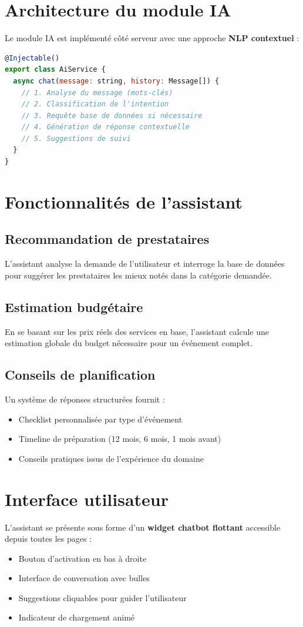 \documentclass[12pt,a4paper]{report}
\begin{document}
\section{Architecture du module IA}
Le module IA est implémenté côté serveur avec une approche \textbf{NLP contextuel} :

\begin{lstlisting}[language=JavaScript, caption=Architecture du service AI]
@Injectable()
export class AiService {
  async chat(message: string, history: Message[]) {
    // 1. Analyse du message (mots-clés)
    // 2. Classification de l'intention
    // 3. Requête base de données si nécessaire
    // 4. Génération de réponse contextuelle
    // 5. Suggestions de suivi
  }
}
\end{lstlisting}

\section{Fonctionnalités de l'assistant}

\subsection{Recommandation de prestataires}
L'assistant analyse la demande de l'utilisateur et interroge la base de données pour suggérer les prestataires les mieux notés dans la catégorie demandée.

\subsection{Estimation budgétaire}
En se basant sur les prix réels des services en base, l'assistant calcule une estimation globale du budget nécessaire pour un événement complet.

\subsection{Conseils de planification}
Un système de réponses structurées fournit :
\begin{itemize}
  \item Checklist personnalisée par type d'événement
  \item Timeline de préparation (12 mois, 6 mois, 1 mois avant)
  \item Conseils pratiques issus de l'expérience du domaine
\end{itemize}

\section{Interface utilisateur}
L'assistant se présente sous forme d'un \textbf{widget chatbot flottant} accessible depuis toutes les pages :
\begin{itemize}
  \item Bouton d'activation en bas à droite
  \item Interface de conversation avec bulles
  \item Suggestions cliquables pour guider l'utilisateur
  \item Indicateur de chargement animé
\end{itemize}
\end{document}
